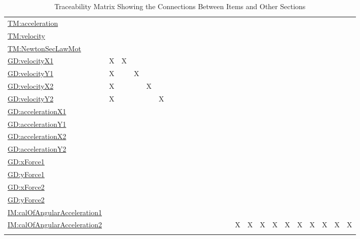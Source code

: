 \documentclass[12pt]{article}
\begin{document}
\begin{longtable}{l l l l l l l l l l l l l l l l l l l l l l l l l}
\hyperref[TM:acceleration]{TM:acceleration} &  &  &  &  &  &  &  &  &  &  &  &  &  &  &  &  &  &  &  &  &  &  &  & 
\\
\hyperref[TM:velocity]{TM:velocity} &  &  &  &  &  &  &  &  &  &  &  &  &  &  &  &  &  &  &  &  &  &  &  & 
\\
\hyperref[TM:NewtonSecLawMot]{TM:NewtonSecLawMot} &  &  &  &  &  &  &  &  &  &  &  &  &  &  &  &  &  &  &  &  &  &  &  & 
\\
\hyperref[GD:velocityX1]{GD:velocityX1} & X & X &  &  &  &  &  &  &  &  &  &  &  &  &  &  &  &  &  &  &  &  &  & 
\\
\hyperref[GD:velocityY1]{GD:velocityY1} & X &  & X &  &  &  &  &  &  &  &  &  &  &  &  &  &  &  &  &  &  &  &  & 
\\
\hyperref[GD:velocityX2]{GD:velocityX2} & X &  &  & X &  &  &  &  &  &  &  &  &  &  &  &  &  &  &  &  &  &  &  & 
\\
\hyperref[GD:velocityY2]{GD:velocityY2} & X &  &  &  & X &  &  &  &  &  &  &  &  &  &  &  &  &  &  &  &  &  &  & 
\\
\hyperref[GD:accelerationX1]{GD:accelerationX1} &  &  &  &  &  &  &  &  &  &  &  &  &  &  &  &  &  &  &  &  &  &  &  & 
\\
\hyperref[GD:accelerationY1]{GD:accelerationY1} &  &  &  &  &  &  &  &  &  &  &  &  &  &  &  &  &  &  &  &  &  &  &  & 
\\
\hyperref[GD:accelerationX2]{GD:accelerationX2} &  &  &  &  &  &  &  &  &  &  &  &  &  &  &  &  &  &  &  &  &  &  &  & 
\\
\hyperref[GD:accelerationY2]{GD:accelerationY2} &  &  &  &  &  &  &  &  &  &  &  &  &  &  &  &  &  &  &  &  &  &  &  & 
\\
\hyperref[GD:xForce1]{GD:xForce1} &  &  &  &  &  &  &  &  &  &  &  &  &  &  &  &  &  &  &  &  &  &  &  & 
\\
\hyperref[GD:yForce1]{GD:yForce1} &  &  &  &  &  &  &  &  &  &  &  &  &  &  &  &  &  &  &  &  &  &  &  & 
\\
\hyperref[GD:xForce2]{GD:xForce2} &  &  &  &  &  &  &  &  &  &  &  &  &  &  &  &  &  &  &  &  &  &  &  & 
\\
\hyperref[GD:yForce2]{GD:yForce2} &  &  &  &  &  &  &  &  &  &  &  &  &  &  &  &  &  &  &  &  &  &  &  & 
\\
\hyperref[IM:calOfAngularAcceleration1]{IM:calOfAngularAcceleration1} &  &  &  &  &  &  &  &  &  &  &  &  &  &  &  &  &  &  &  &  &  &  &  & 
\\
\hyperref[IM:calOfAngularAcceleration2]{IM:calOfAngularAcceleration2} &  &  &  &  &  &  &  &  &  &  &  &  &  &  & X & X & X & X & X & X & X & X & X & X
\\
\bottomrule
\caption{Traceability Matrix Showing the Connections Between Items and Other Sections}
\label{Table:TraceMatRefvsRef}
\end{longtable}
\end{document}
